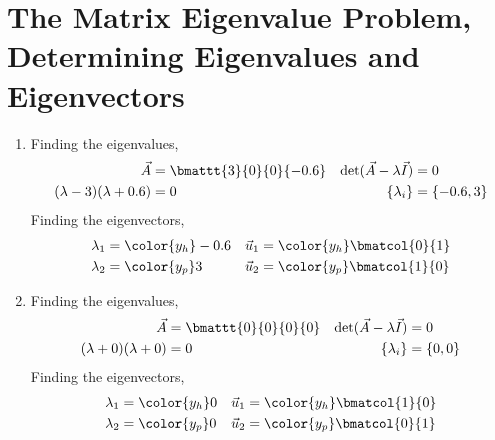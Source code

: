\section{The Matrix Eigenvalue Problem, Determining Eigenvalues and Eigenvectors}

\begin{enumerate}
    \item Finding the eigenvalues,
          \begin{align}
              \vec{A}                        & = \bmattt{3}{0}{0}{-0.6} &
              \det(\vec{A} - \lambda\vec{I}) & = 0                        \\
              (\lambda - 3)(\lambda + 0.6)   & = 0                      &
              \{\lambda_i\}                  & = \{-0.6, 3\}
          \end{align}
          Finding the eigenvectors,
          \begin{align}
              \lambda_1 & = \color{y_h} -0.6           &
              \vec{u}_1 & = \color{y_h} \bmatcol{0}{1}   \\
              \lambda_2 & = \color{y_p} 3              &
              \vec{u}_2 & = \color{y_p} \bmatcol{1}{0}
          \end{align}

    \item Finding the eigenvalues,
          \begin{align}
              \vec{A}                        & = \bmattt{0}{0}{0}{0} &
              \det(\vec{A} - \lambda\vec{I}) & = 0                     \\
              (\lambda + 0)(\lambda + 0)     & = 0                   &
              \{\lambda_i\}                  & = \{0, 0\}
          \end{align}
          Finding the eigenvectors,
          \begin{align}
              \lambda_1 & = \color{y_h} 0              &
              \vec{u}_1 & = \color{y_h} \bmatcol{1}{0}   \\
              \lambda_2 & = \color{y_p} 0              &
              \vec{u}_2 & = \color{y_p} \bmatcol{0}{1}
          \end{align}


\end{enumerate}
